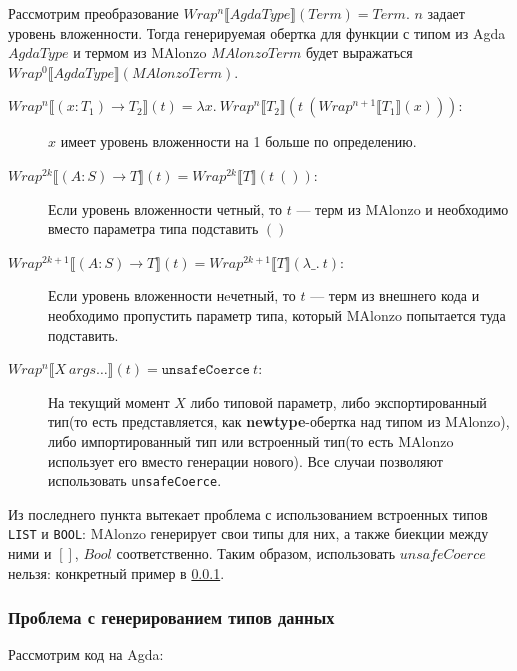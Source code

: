 Рассмотрим преобразование \(Wrap^n\llbracket AgdaType \rrbracket(Term) = Term\).
\(n\) задает уровень вложенности. Тогда генерируемая
обертка для функции с типом из Agda \(AgdaType\) и термом из MAlonzo \(MAlonzoTerm\)
будет выражаться \(Wrap^0\llbracket AgdaType \rrbracket(MAlonzoTerm)\).

\begin{description}
\item[\(Wrap^n\llbracket (x : T_1) \rightarrow T_2 \rrbracket(t) =
   \lambda x.\ Wrap^n\llbracket T_2 \rrbracket(t\ (
   Wrap^{n+1}\llbracket T_1 \rrbracket(x)))\):]
\(x\) имеет уровень вложенности на 1 больше по определению.
\item[\(Wrap^{2k}\llbracket (A : S) \rightarrow T \rrbracket(t) =
   Wrap^{2k}\llbracket T \rrbracket(t\ ())\):]
Если уровень вложенности четный, то \(t\) --- терм из MAlonzo и необходимо
вместо параметра типа подставить \(()\)

\item[\(Wrap^{2k + 1}\llbracket (A : S) \rightarrow T \rrbracket(t) =
   Wrap^{2k + 1}\llbracket T \rrbracket(\lambda \_.\ t)\):]
Если уровень вложенности нeчетный, то \(t\) --- терм из внешнего кода и необходимо
пропустить параметр типа, который MAlonzo попытается туда подставить.

\item[\(Wrap^n\llbracket X\ args\dots \rrbracket(t) = \texttt{unsafeCoerce}\ t\):]
На текущий момент \(X\) либо типовой параметр, либо экспортированный тип(то
есть представляется, как \textbf{newtype}-обертка над типом из MAlonzo),
либо импортированный тип или встроенный тип(то есть MAlonzo использует его
вместо генерации нового). Все случаи позволяют использовать \texttt{unsafeCoerce}.
\end{description}

Из последнего пункта вытекает проблема с использованием встроенных типов
\texttt{LIST} и \texttt{BOOL}: MAlonzo генерирует свои типы для них, а также
биекции между ними и \([]\), \(Bool\) соответственно. Таким образом, использовать
\(unsafeCoerce\) нельзя: конкретный пример в \ref{sec:implementation-data-trouble}.

\subsubsection{Проблема с генерированием типов данных}
\label{sec:implementation-data-trouble}

Рассмотрим код на Agda:

